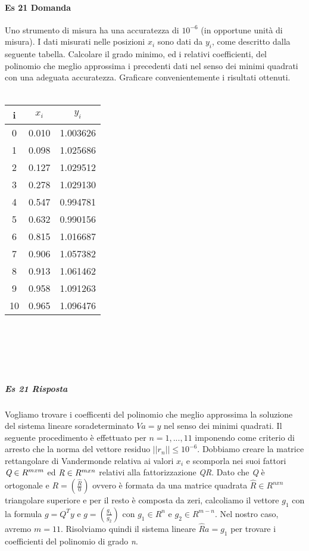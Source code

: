 \documentclass[a4paper]{report}
\begin{document}
\paragraph{Es 21 Domanda}
Uno strumento di misura ha una accuratezza di $10^{-6}$ (in opportune unità di misura). I dati misurati nelle posizioni $x_i$ sono dati da $y_i$, come descritto dalla seguente tabella. Calcolare il grado minimo, ed i
relativi coefficienti, del polinomio che meglio approssima i precedenti dati nel senso dei minimi quadrati con una adeguata accuratezza. Graficare convenientemente i risultati ottenuti.\\ \\
\begin{tabular}{|c|c|c|}	%
	\hline
	i &$x_i$ &$y_i$\\ \hline
	0 &0.010 &1.003626 \\ \hline
	1 &0.098 &1.025686 \\ \hline
	2 &0.127 &1.029512 \\ \hline
	3 &0.278 &1.029130 \\ \hline
	4 &0.547 &0.994781 \\ \hline
	5 &0.632 &0.990156 \\ \hline
	6 &0.815 &1.016687 \\ \hline
	7 &0.906 &1.057382 \\ \hline
	8 &0.913 &1.061462 \\ \hline
	9 &0.958 &1.091263 \\ \hline
	10& 0.965& 1.096476\\ \hline
\end{tabular}
\\ \\  \\ \\
\subparagraph{Es 21 Risposta}
Vogliamo trovare i coefficenti del polinomio che meglio approssima la soluzione del sistema lineare soradeterminato $Va=y$ nel senso dei minimi quadrati. Il seguente procedimento è effettuato per $n=1,...,11$ imponendo come criterio di arresto che la norma del vettore residuo $||r_n|| \leq 10^{-6}$.
Dobbiamo creare la matrice rettangolare di Vandermonde relativa ai valori $x_i$ e scomporla nei suoi fattori $\emph{Q}\in R^{mxm}$ ed $\emph{R}\in R^{mxn}$ relativi alla fattorizzazione \emph{QR}. Dato che \emph{Q} è ortogonale e $R=(\frac{\hat{R}}{0})$ ovvero è formata da una matrice quadrata $\hat{R}\in R^{nxn}$ triangolare superiore e per il resto è composta da zeri, calcoliamo il vettore $g_1$ con la formula $g = Q^Ty$ e $g = (\frac{g_1}{g_2})$ con $g_1 \in R^{n}$ e $g_2 \in R^{m-n}$. Nel nostro caso, avremo $m = 11$. Risolviamo quindi il sistema lineare $\hat{R}a=g_1$ per trovare i coefficienti del polinomio di grado \emph{n}.\\
\end{document}
